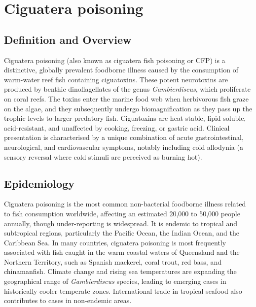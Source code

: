 \chapter{Ciguatera poisoning}

\section*{Definition and Overview}
Ciguatera poisoning (also known as ciguatera fish poisoning or CFP) is a distinctive, globally prevalent foodborne illness caused by the consumption of warm-water reef fish containing ciguatoxins. These potent neurotoxins are produced by benthic dinoflagellates of the genus \textit{Gambierdiscus}, which proliferate on coral reefs. The toxins enter the marine food web when herbivorous fish graze on the algae, and they subsequently undergo biomagnification as they pass up the trophic levels to larger predatory fish. Ciguatoxins are heat-stable, lipid-soluble, acid-resistant, and unaffected by cooking, freezing, or gastric acid. Clinical presentation is characterised by a unique combination of acute gastrointestinal, neurological, and cardiovascular symptoms, notably including cold allodynia (a sensory reversal where cold stimuli are perceived as burning hot).

\section*{Epidemiology}
Ciguatera poisoning is the most common non-bacterial foodborne illness related to fish consumption worldwide, affecting an estimated 20,000 to 50,000 people annually, though under-reporting is widespread. It is endemic to tropical and subtropical regions, particularly the Pacific Ocean, the Indian Ocean, and the Caribbean Sea. In many countries, ciguatera poisoning is most frequently associated with fish caught in the warm coastal waters of Queensland and the Northern Territory, such as Spanish mackerel, coral trout, red bass, and chinamanfish. Climate change and rising sea temperatures are expanding the geographical range of \textit{Gambierdiscus} species, leading to emerging cases in historically cooler temperate zones. International trade in tropical seafood also contributes to cases in non-endemic areas.

